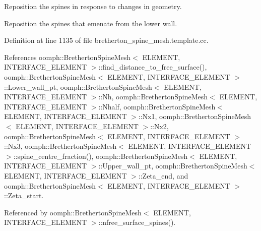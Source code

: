 Reposition the spines in response to changes in geometry. 

Reposition the spines that emenate from the lower wall. 

Definition at line 1135 of file bretherton\+\_\+spine\+\_\+mesh.\+template.\+cc.



References oomph\+::\+Bretherton\+Spine\+Mesh$<$ E\+L\+E\+M\+E\+N\+T, I\+N\+T\+E\+R\+F\+A\+C\+E\+\_\+\+E\+L\+E\+M\+E\+N\+T $>$\+::find\+\_\+distance\+\_\+to\+\_\+free\+\_\+surface(), oomph\+::\+Bretherton\+Spine\+Mesh$<$ E\+L\+E\+M\+E\+N\+T, I\+N\+T\+E\+R\+F\+A\+C\+E\+\_\+\+E\+L\+E\+M\+E\+N\+T $>$\+::\+Lower\+\_\+wall\+\_\+pt, oomph\+::\+Bretherton\+Spine\+Mesh$<$ E\+L\+E\+M\+E\+N\+T, I\+N\+T\+E\+R\+F\+A\+C\+E\+\_\+\+E\+L\+E\+M\+E\+N\+T $>$\+::\+Nh, oomph\+::\+Bretherton\+Spine\+Mesh$<$ E\+L\+E\+M\+E\+N\+T, I\+N\+T\+E\+R\+F\+A\+C\+E\+\_\+\+E\+L\+E\+M\+E\+N\+T $>$\+::\+Nhalf, oomph\+::\+Bretherton\+Spine\+Mesh$<$ E\+L\+E\+M\+E\+N\+T, I\+N\+T\+E\+R\+F\+A\+C\+E\+\_\+\+E\+L\+E\+M\+E\+N\+T $>$\+::\+Nx1, oomph\+::\+Bretherton\+Spine\+Mesh$<$ E\+L\+E\+M\+E\+N\+T, I\+N\+T\+E\+R\+F\+A\+C\+E\+\_\+\+E\+L\+E\+M\+E\+N\+T $>$\+::\+Nx2, oomph\+::\+Bretherton\+Spine\+Mesh$<$ E\+L\+E\+M\+E\+N\+T, I\+N\+T\+E\+R\+F\+A\+C\+E\+\_\+\+E\+L\+E\+M\+E\+N\+T $>$\+::\+Nx3, oomph\+::\+Bretherton\+Spine\+Mesh$<$ E\+L\+E\+M\+E\+N\+T, I\+N\+T\+E\+R\+F\+A\+C\+E\+\_\+\+E\+L\+E\+M\+E\+N\+T $>$\+::spine\+\_\+centre\+\_\+fraction(), oomph\+::\+Bretherton\+Spine\+Mesh$<$ E\+L\+E\+M\+E\+N\+T, I\+N\+T\+E\+R\+F\+A\+C\+E\+\_\+\+E\+L\+E\+M\+E\+N\+T $>$\+::\+Upper\+\_\+wall\+\_\+pt, oomph\+::\+Bretherton\+Spine\+Mesh$<$ E\+L\+E\+M\+E\+N\+T, I\+N\+T\+E\+R\+F\+A\+C\+E\+\_\+\+E\+L\+E\+M\+E\+N\+T $>$\+::\+Zeta\+\_\+end, and oomph\+::\+Bretherton\+Spine\+Mesh$<$ E\+L\+E\+M\+E\+N\+T, I\+N\+T\+E\+R\+F\+A\+C\+E\+\_\+\+E\+L\+E\+M\+E\+N\+T $>$\+::\+Zeta\+\_\+start.



Referenced by oomph\+::\+Bretherton\+Spine\+Mesh$<$ E\+L\+E\+M\+E\+N\+T, I\+N\+T\+E\+R\+F\+A\+C\+E\+\_\+\+E\+L\+E\+M\+E\+N\+T $>$\+::nfree\+\_\+surface\+\_\+spines().

\mbox{\label{classoomph_1_1BrethertonSpineMesh_a33c3ed5af92e7b22a22615f42c34c387}} 

